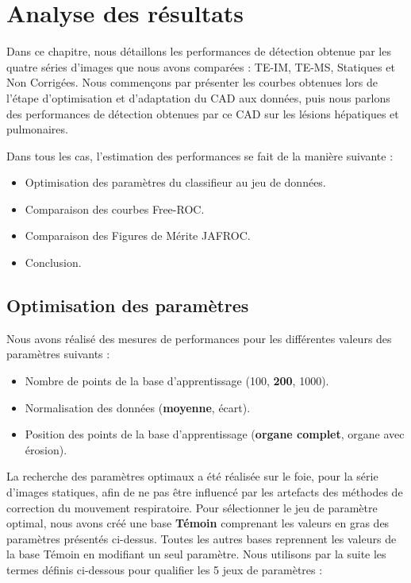 

\chapter{Analyse des résultats}

Dans ce chapitre, nous détaillons les performances de détection obtenue par les quatre séries d'images que nous avons comparées : TE-IM, TE-MS, Statiques et Non Corrigées. Nous commençons par présenter les courbes obtenues lors de l'étape d'optimisation et d'adaptation du CAD aux données, puis nous parlons des performances de détection obtenues par ce CAD sur les lésions hépatiques et pulmonaires.

Dans tous les cas, l'estimation des performances se fait de la manière suivante :

\begin{itemize}
 \item Optimisation des paramètres du classifieur au jeu de données.
 \item Comparaison des courbes Free-ROC.
 \item Comparaison des Figures de Mérite JAFROC.
 \item Conclusion.
\end{itemize}


\section{Optimisation des paramètres}

Nous avons réalisé des mesures de performances pour les différentes valeurs des paramètres suivants :

\begin{itemize}
 \item Nombre de points de la base d'apprentissage (100, \textbf{200}, 1000).
 \item Normalisation des données (\textbf{moyenne}, écart).
 \item Position des points de la base d'apprentissage (\textbf{organe complet}, organe avec érosion).
\end{itemize}

La recherche des paramètres optimaux a été réalisée sur le foie, pour la série d'images statiques, afin de ne pas être influencé par les artefacts des méthodes de correction du mouvement respiratoire. Pour sélectionner le jeu de paramètre optimal, nous avons créé une base \textbf{Témoin} comprenant les valeurs en gras des paramètres présentés ci-dessus. Toutes les autres bases reprennent les valeurs de la base Témoin en modifiant un seul paramètre. Nous utilisons par la suite les termes définis ci-dessous pour qualifier les 5 jeux de paramètres :

